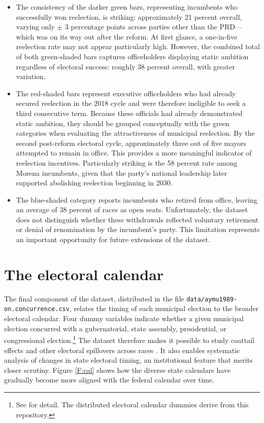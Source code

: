 \documentclass[letter,12pt]{article}
\begin{document}
\begin{itemize}
\item The consistency of the darker green bars, representing incumbents who successfully won reelection, is striking: approximately 21 percent overall, varying only $\pm$ 3 percentage points across parties other than the PRD---which was on its way out after the reform. At first glance, a one-in-five reelection rate may not appear particularly high. However, the combined total of both green-shaded bars captures officeholders displaying static ambition regardless of electoral success: roughly 38 percent overall, with greater variation.
\item The red-shaded bars represent executive officeholders who had already secured reelection in the 2018 cycle and were therefore ineligible to seek a third consecutive term. Because these officials had already demonstrated static ambition, they should be grouped conceptually with the green categories when evaluating the attractiveness of municipal reelection. By the second post-reform electoral cycle, approximately three out of five mayors attempted to remain in office. This provides a more meaningful indicator of reelection incentives. Particularly striking is the 58 percent rate among Morena incumbents, given that the party's national leadership later supported abolishing reelection beginning in 2030. 
\item The blue-shaded category reports incumbents who retired from office, leaving an average of 38 percent of races as open seats. Unfortunately, the dataset does not distinguish whether these withdrawals reflected voluntary retirement or denial of renomination by the incumbent's party. This limitation represents an important opportunity for future extensions of the dataset.
\end{itemize}
  
\section{The electoral calendar}\label{S:cal}

The final component of the dataset, distributed in the file \verb|data/aymu1989-on.concurrence.csv|, relates the timing of each municipal election to the broader electoral calendar. Four dummy variables indicate whether a given municipal election concurred with a gubernatorial, state assembly, presidential, or congressional election.\footnote{See \citet{magarInstReel.2017} for detail. The distributed electoral calendar dummies derive from this repository.} The dataset therefore makes it possible to study coattail effects and other electoral spillovers across races \citep[e.g.,][]{magar.gubCoatMx.2012, ames.1994}. It also enables systematic analysis of changes in state electoral timing, an institutional feature that merits closer scrutiny. Figure \ref{F:cal} shows how the diverse state calendars have gradually become more aligned with the federal calendar over time.
\end{document}
